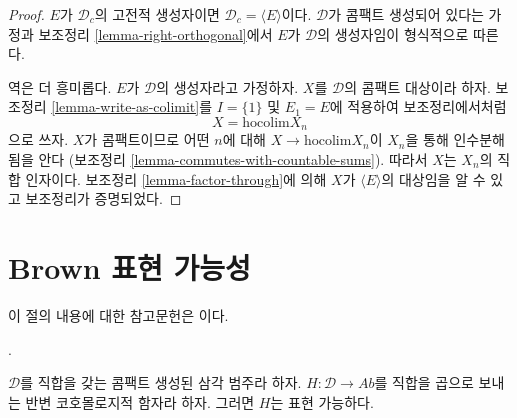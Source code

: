 \begin{proof}
$E$가 $\mathcal{D}_c$의 고전적 생성자이면
$\mathcal{D}_c = \langle E \rangle$이다. $\mathcal{D}$가 콤팩트
생성되어 있다는 가정과 보조정리 \ref{lemma-right-orthogonal}에서
$E$가 $\mathcal{D}$의 생성자임이 형식적으로 따른다.

\medskip\noindent
역은 더 흥미롭다. $E$가 $\mathcal{D}$의 생성자라고 가정하자.
$X$를 $\mathcal{D}$의 콤팩트 대상이라 하자. 보조정리
\ref{lemma-write-as-colimit}를 $I = \{1\}$ 및 $E_1 = E$에 적용하여
보조정리에서처럼
$$
X = \text{hocolim} X_n
$$
으로 쓰자. $X$가 콤팩트이므로 어떤 $n$에 대해
$X \to \text{hocolim} X_n$이 $X_n$을 통해 인수분해됨을 안다
(보조정리 \ref{lemma-commutes-with-countable-sums}). 따라서 $X$는
$X_n$의 직합 인자이다. 보조정리 \ref{lemma-factor-through}에 의해
$X$가 $\langle E \rangle$의 대상임을 알 수 있고 보조정리가 증명되었다.
\end{proof}

\section{Brown 표현 가능성}
\label{section-brown}

\noindent
이 절의 내용에 대한 참고문헌은 \cite{Neeman-Grothendieck}이다.

\begin{lemma}
\label{lemma-brown}
\begin{reference}
\cite[Theorem 3.1]{Neeman-Grothendieck}.
\end{reference}
$\mathcal{D}$를 직합을 갖는 콤팩트 생성된 삼각 범주라 하자.
$H : \mathcal{D} \to \textit{Ab}$를 직합을 곱으로 보내는 반변
코호몰로지적 함자라 하자. 그러면 $H$는 표현 가능하다.
\end{lemma}

